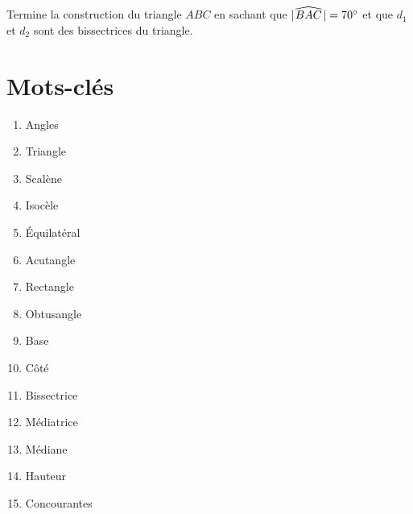 \documentclass[../../syllabus_1.tex]{subfiles}
\begin{document}
\begin{exercise}
    Termine la construction du triangle $ABC$ en sachant que $\lvert\mkern2mu\widehat{BAC}\mkern2mu\rvert=\ang{70}$ et que $d_1$ et $d_2$ sont des bissectrices du triangle.
    \begin{center}
    \end{center}
\end{exercise}

% 
% 
% 
% 
% 
% 
\newpage
\section*{Mots-clés}
\begin{enumerate}[cols=4, label=\textbf{\arabic*.}]
    \item Angles
    \item Triangle
    \item Scalène
    \item Isocèle
    \item Équilatéral
    \item Acutangle
    \item Rectangle
    \item Obtusangle
    \item Base
    \item Côté
    \item Bissectrice
    \item Médiatrice
    \item Médiane
    \item Hauteur
    \item Concourantes
\end{enumerate}
\end{document}
